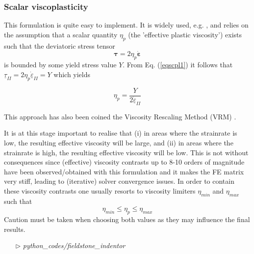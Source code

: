 \subsubsection{Scalar viscoplasticity}

This formulation is quite easy to implement. It is widely used, e.g. \cite{will92,thfb08,spmw16}, and relies on the assumption that 
a scalar quantity $\eta_p$ (the 'effective plastic viscosity') exists such that the deviatoric stress tensor 
\begin{equation}
{\bm \tau}=2\eta_p \dot{\bm\varepsilon} \label{eqscpl1}
\end{equation}
is bounded by some yield stress value $Y$.
From Eq. (\ref{eqscpl1}) it follows that $\underline{\tau}_{II}= 2\eta_p \dot{\underline{\varepsilon}}_{II}=Y$ which yields
\begin{mdframed}[backgroundcolor=blue!5]
\[
\eta_p = \frac{Y}{2 \dot{\underline{\varepsilon}}_{II}}
\]
\end{mdframed}
This approach has also been coined the Viscosity Rescaling Method (VRM) \cite{kacha04}.  


It is at this stage important to realise that (i) in areas where the strainrate is low, the resulting effective viscosity will be large, and 
(ii) in areas where the strainrate is high, the resulting effective viscosity will be low. This is not without consequences since 
(effective) viscosity contrasts up to 8-10 orders of magnitude have been observed/obtained with this formulation and it makes the FE 
matrix very stiff, leading to (iterative) solver convergence issues.
In order to contain these viscosity contrasts one usually resorts to viscosity limiters $\eta_{min}$ and $\eta_{max}$ such that 
\[
\eta_{min} \leq \eta_p \leq \eta_{max}
\]
Caution must be taken when choosing both values as they may influence the final results.


\begin{mdframed}[backgroundcolor=green!5]
\begin{itemize}
\item[$\triangleright$] {\sl python\_codes/fieldstone\_indentor}
\end{itemize}
\end{mdframed}





